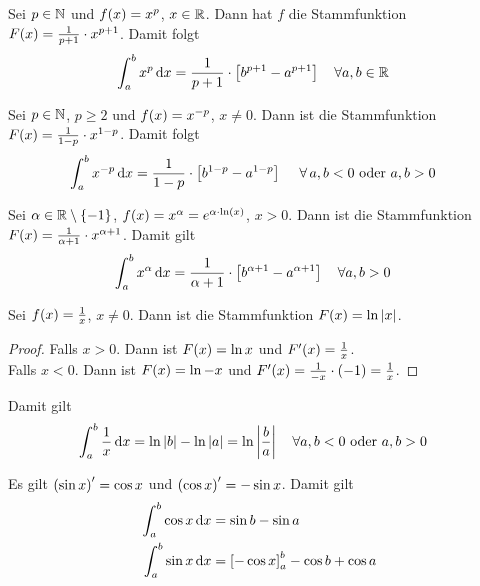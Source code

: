 \begin{beispiel}
    Sei $p\in\mathbb{N}$ und $f\of{x} = x^{p}$, $x\in\mathbb{R}$. Dann hat $f$ die Stammfunktion $F\of{x} = \frac{1}{p+1}\cdot x^{p+1}$. Damit folgt
    \begin{align*}
        \int_{a}^{b} x^p \mathop{}\!\mathrm{d} x &= \frac{1}{p+1} \cdot \left[b^{p+1} - a^{p+1}\right]\quad\forall a, b\in\mathbb{R}
    \end{align*}
\end{beispiel}
\begin{beispiel}
    Sei $p\in\mathbb{N}$, $p\geq 2$ und $f\of{x} = x^{-p}$, $x\neq 0$. Dann ist die Stammfunktion $F\of{x} = \frac{1}{1-p}\cdot x^{1-p}$. Damit folgt
    \begin{align*}
        \int_{a}^{b} x^{-p} \mathop{}\!\mathrm{d} x &= \frac{1}{1-p}\cdot\left[b^{1-p} - a^{1-p}\right]\quad \;\forall\, a,b < 0 \text{ oder } a,b > 0
    \end{align*}
\end{beispiel}
\begin{beispiel}
    Sei $\alpha\in\mathbb{R}\setminus\left\{-1\right\}$, $f\of{x} = x^{\alpha} = e^{\alpha\cdot\ln\of{x}}$, $x > 0$. Dann ist die Stammfunktion $F\of{x} = \frac{1}{\alpha + 1}\cdot x^{\alpha + 1}$. Damit gilt
    \begin{align*}
        \int_{a}^{b} x^{\alpha} \mathop{}\!\mathrm{d} x &= \frac{1}{\alpha +1}\cdot\left[b^{\alpha+1} - a^{\alpha+1}\right]\quad\forall a,b > 0
    \end{align*}
\end{beispiel}
\begin{beispiel}
    Sei $f\of{x} = \frac{1}{x}$, $x\neq 0$. Dann ist die Stammfunktion $F\of{x} = \ln \abs{x}$.
    \begin{proof}
        Falls $x > 0$. Dann ist $F\of{x} = \ln x$ und $F'\of{x} = \frac{1}{x}$.\\
        Falls $x < 0$. Dann ist $F\of{x} = \ln -x$ und $F'\of{x} = \frac{1}{-x}\cdot\pair{-1} = \frac{1}{x}$.
    \end{proof}
    \noindent Damit gilt
    \begin{align*}
        \int_{a}^{b} \frac{1}{x} \mathop{}\!\mathrm{d} x &= \ln\left\lvert b\right\rvert - \ln\left\lvert a\right\rvert = \ln\left\lvert\frac{b}{a}\right\rvert\quad\forall a,b < 0 \text{ oder } a,b > 0
    \end{align*}
\end{beispiel}

\begin{beispiel}
    Es gilt $\left(\sin x\right)' = \cos x$ und $\left(\cos x\right)' = -\sin x$. Damit gilt
    \begin{align*}
        \int_{a}^{b} \cos x \mathop{}\!\mathrm{d} x &= \sin b - \sin a\\
        \int_{a}^{b} \sin x \mathop{}\!\mathrm{d} x &= \left[-\cos x\right]_a^b -\cos b + \cos a\\
    \end{align*}
\end{beispiel}

